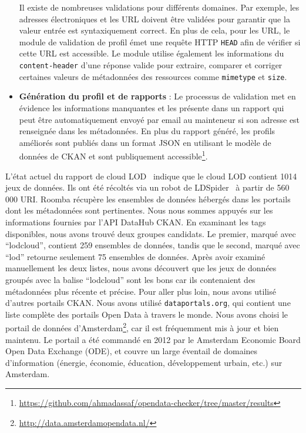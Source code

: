\begin{itemize}
	Il existe de nombreuses validations pour diff\'{e}rents domaines. Par exemple, les adresses \'{e}lectroniques et les URL doivent \^{e}tre valid\'{e}es pour garantir que la valeur entr\'{e}e est syntaxiquement correct. En plus de cela, pour les URL, le module de validation de profil \'{e}met une requ\^{e}te HTTP \texttt{HEAD} afin de v\'{e}rifier si cette URL est accessible. Le module utilise \'{e}galement les informations du \texttt{content-header} d'une r\'{e}ponse valide pour extraire, comparer et corriger certaines valeurs de m\'{e}tadonn\'{e}es des ressources comme \texttt{mimetype} et \texttt{size}.
	\item \textbf{G\'{e}n\'{e}ration du profil et de rapports} : Le processus de validation met en \'{e}vidence les informations manquantes et les pr\'{e}sente dans un rapport qui peut \^{e}tre automatiquement envoy\'{e} par email au mainteneur si son adresse est renseign\'{e}e dans les m\'{e}tadonn\'{e}es. En plus du rapport g\'{e}n\'{e}r\'{e}, les profils am\'{e}lior\'{e}s sont publi\'{e}s dans un format JSON en utilisant le mod\`{e}le de donn\'{e}es de CKAN et sont publiquement accessible\footnote{\url{https://github.com/ahmadassaf/opendata-checker/tree/master/results}}.
\end{itemize}

L'\'{e}tat actuel du rapport de cloud LOD~\cite{Schmachtenberg:ISWC:14} indique que le cloud LOD contient 1014 jeux de donn\'{e}es. Ils ont \'{e}t\'{e} r\'{e}colt\'{e}s via un robot de LDSpider~\cite{Isele:ISWC:10} \`{a} partir de 560 000 URI. Roomba r\'{e}cup\`{e}re les ensembles de donn\'{e}es h\'{e}berg\'{e}s dans les portails dont les m\'{e}tadonn\'{e}es sont pertinentes. Nous nous sommes appuy\'{e}s sur les informations fournies par l'API DataHub CKAN. En examinant les tags disponibles, nous avons trouv\'{e} deux groupes candidats. Le premier, marqu\'{e} avec ``lodcloud'', contient 259 ensembles de donn\'{e}es, tandis que le second, marqu\'{e} avec ``lod'' retourne seulement 75 ensembles de donn\'{e}es. Apr\`{e}s avoir examin\'{e} manuellement les deux listes, nous avons d\'{e}couvert que les jeux de donn\'{e}es group\'{e}s avec la balise ``lodcloud'' sont les bons car ils contenaient des m\'{e}tadonn\'{e}es plus r\'{e}cente et pr\'{e}cise. Pour aller plus loin, nous avons utilis\'{e} d'autres portails CKAN. Nous avons utilis\'{e} \texttt{dataportals.org}, qui contient une liste compl\`{e}te des portails Open Data \`{a} travers le monde. Nous avons choisi le portail de donn\'{e}es d'Amsterdam\footnote{\url{http://data.amsterdamopendata.nl/}}, car il est fr\'{e}quemment mis \`{a} jour et bien maintenu. Le portail a \'{e}t\'{e} command\'{e} en 2012 par le Amsterdam Economic Board Open Data Exchange (ODE), et couvre un large \'{e}ventail de domaines d'information (\'{e}nergie, \'{e}conomie, \'{e}ducation, d\'{e}veloppement urbain, etc.) sur Amsterdam.


